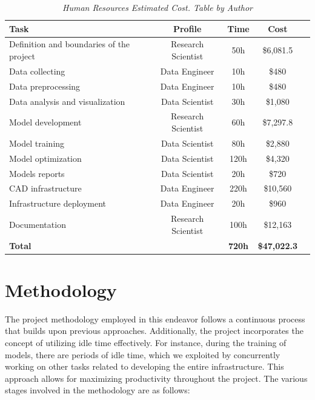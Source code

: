 \newpage

\begin{table}[H]
  \centering
  \begin{tabular}{lcccc}
    \toprule
    \textbf{Task} & \textbf{Profile} & \textbf{Time} & \textbf{Cost} \\
    \midrule
    Definition and boundaries of the project & Research Scientist & 50h & \$6,081.5\\
    Data collecting & Data Engineer & 10h & \$480\\
    Data preprocessing & Data Engineer & 10h & \$480 \\
    Data analysis and visualization & Data Scientist & 30h & \$1,080\\
    Model development & Research Scientist & 60h & \$7,297.8 \\
    Model training & Data Scientist & 80h & \$2,880 \\
    Model optimization & Data Scientist & 120h & \$4,320 \\
    Models reports & Data Scientist & 20h & \$720 \\
    CAD infrastructure & Data Engineer & 220h & \$10,560 \\
    Infrastructure deployment & Data Engineer & 20h & \$960 \\
    Documentation & Research Scientist & 100h & \$12,163 \\
    \midrule
    \textbf{Total} &    &  \textbf{720h} & \textbf{\$47,022.3} \\
    \bottomrule
  \end{tabular}
  \caption[Human Resources Estimated Cost.]
  {\textit{Human Resources Estimated Cost. Table by Author}}
  {\label{table:human_resources_cost}}
\end{table}


\section{Methodology}

The project methodology employed in this endeavor follows a continuous process
that builds upon previous approaches. Additionally, the project incorporates
the concept of utilizing idle time effectively. For instance, during the
training of models, there are periods of idle time, which we exploited by
concurrently working on other tasks related to developing the entire
infrastructure. This approach allows for maximizing productivity throughout the
project. The various stages involved in the methodology are as follows: \\

